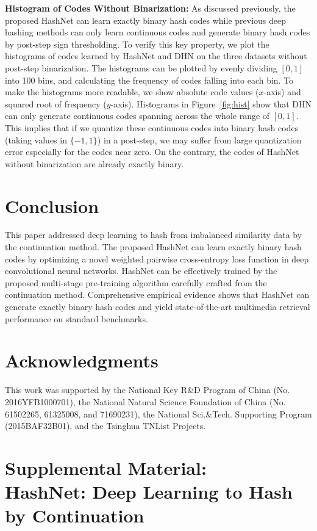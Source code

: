 \documentclass[10pt,twocolumn,letterpaper]{article}
\begin{document}
\textbf{Histogram of Codes Without Binarization:}
As discussed previously, the proposed HashNet can learn exactly binary hash codes while previous deep hashing methods can only learn continuous codes and generate binary hash codes by post-step sign thresholding. To verify this key property, we plot the histograms of codes learned by HashNet and DHN on the three datasets without post-step binarization. The histograms can be plotted by evenly dividing $[0,1]$ into 100 bins, and calculating the frequency of codes falling into each bin. To make the histograms more readable, we show absolute code values ($x$-axis) and squared root of frequency ($y$-axis). Histograms in Figure~\ref{fig:hist} show that DHN can only generate continuous codes spanning across the whole range of $[0,1]$. This implies that if we quantize these continuous codes into binary hash codes (taking values in $\{-1,1\}$) in a post-step, we may suffer from large quantization error especially for the codes near zero. On the contrary, the codes of HashNet without binarization are already exactly binary.

\section{Conclusion}
This paper addressed deep learning to hash from imbalanced similarity data by the continuation method. The proposed HashNet can learn exactly binary hash codes by optimizing a novel weighted pairwise cross-entropy loss function in deep convolutional neural networks. HashNet can be effectively trained by the proposed multi-stage pre-training algorithm carefully crafted from the continuation method. Comprehensive empirical evidence shows that HashNet can generate exactly binary hash codes and yield state-of-the-art multimedia retrieval performance on standard benchmarks.

\section{Acknowledgments}
This work was supported by the National Key R\&D Program of China (No. 2016YFB1000701), the National Natural Science Foundation of China (No. 61502265, 61325008, and 71690231), the National Sci.\&Tech. Supporting Program (2015BAF32B01), and the Tsinghua TNList Projects.


\section{Supplemental Material:\\HashNet: Deep Learning to Hash by Continuation}
\end{document}
